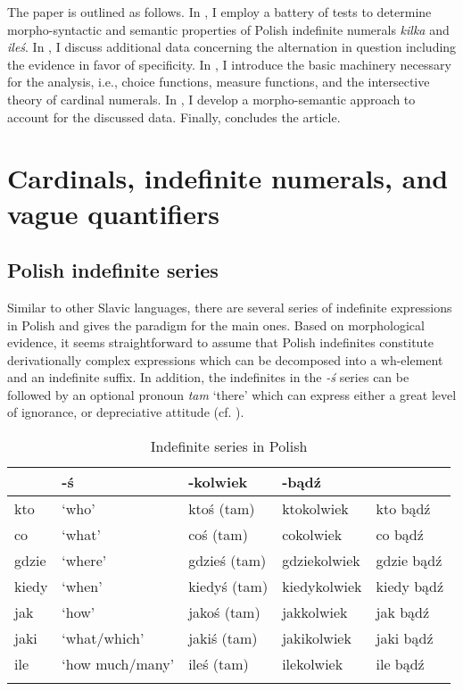 \documentclass[output=paper,
]{langscibook}
\begin{document}
	The paper is outlined as follows. In , I employ a battery of tests to determine morpho-syntactic and semantic properties of Polish indefinite numerals \textit{kilka} and \textit{ileś}. In , I discuss additional data concerning the alternation in question including the evidence in favor of specificity. In , I introduce the basic machinery necessary for the analysis, i.e., choice functions, measure functions, and the intersective theory of cardinal numerals. In , I develop a morpho-semantic approach to account for the discussed data. Finally,  concludes the article.
	
	\section{Cardinals, indefinite numerals, and vague quantifiers}\label{sec:cardinals-indefinite-numerals-and-vague-quantifiers}
	
	\subsection{Polish indefinite series}\label{sec:polish-indefinite-series}
	
	Similar to other Slavic languages, there are several series of indefinite expressions in Polish and  gives the paradigm for the main ones. Based on morphological evidence, it seems straightforward to assume that Polish indefinites constitute derivationally complex expressions which can be decomposed into a wh-element and an indefinite suffix. In addition, the indefinites in the \textit{-ś} series can be followed by an optional pronoun \textit{tam} `there' which can express either a great level of ignorance, or depreciative attitude (cf. \citealt{bylinina2010depreciative}).
	
	\begin{table}[h]
		\centering
		\caption{Indefinite series in Polish}
		\label{table:indefinite-series-in-polish}
		\begin{tabularx}{\textwidth}{llXXX}
			\lsptoprule
			\multicolumn{2}{l}{wh-word} & -ś     & -kolwiek     & -bądź      \\ \midrule
			kto     & `who'   & ktoś (tam)   & ktokolwiek   & kto bądź   \\
			co      & `what'   & coś (tam)   & cokolwiek    & co bądź    \\
			gdzie   & `where'  & gdzieś (tam) & gdziekolwiek & gdzie bądź \\
			kiedy   & `when'   & kiedyś (tam) & kiedykolwiek & kiedy bądź \\
			jak     & `how'    & jakoś (tam) & jakkolwiek   & jak bądź   \\
			jaki    & `what/which'   & jakiś (tam) & jakikolwiek  & jaki bądź  \\
			ile     & `how much/many'  & ileś (tam)  & ilekolwiek   & ile bądź   \\ \lspbottomrule
		\end{tabularx}
	\end{table}
	
\end{document}
